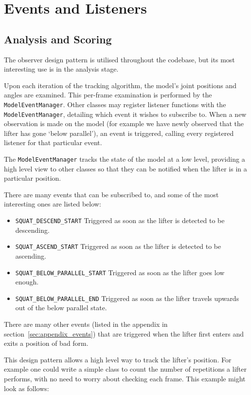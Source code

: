 \section{Events and Listeners}
\label{sec:listeners}

\subsection{Analysis and Scoring}

The observer design pattern is utilised throughout the codebase, but its most interesting use is in the analysis stage.

Upon each iteration of the tracking algorithm, the model's joint positions and angles are examined. This per-frame examination is performed by the \texttt{ModelEventManager}. Other classes may register listener functions with the \texttt{ModelEventManager}, detailing which event it wishes to subscribe to. When a new observation is made on the model (for example we have newly observed that the lifter has gone `below parallel'), an event is triggered, calling every registered listener for that particular event.

The \texttt{ModelEventManager} tracks the state of the model at a low level, providing a high level view to other classes so that they can be notified when the lifter is in a particular position.

There are many events that can be subscribed to, and some of the most interesting ones are listed below:

\begin{itemize}
	\item \texttt{SQUAT\_DESCEND\_START} Triggered as soon as the lifter is detected to be descending.
	\item \texttt{SQUAT\_ASCEND\_START} Triggered as soon as the lifter is detected to be ascending.
	\item \texttt{SQUAT\_BELOW\_PARALLEL\_START} Triggered as soon as the lifter goes low enough.
	\item \texttt{SQUAT\_BELOW\_PARALLEL\_END} Triggered as soon as the lifter travels upwards out of the below parallel state.
\end{itemize}

There are many other events (listed in the appendix in section~\ref{sec:appendix_events}) that are triggered when the lifter first enters and exits a position of bad form.

This design pattern allows a high level way to track the lifter's position. For example one could write a simple class to count the number of repetitions a lifter performs, with no need to worry about checking each frame. This example might look as follows:

